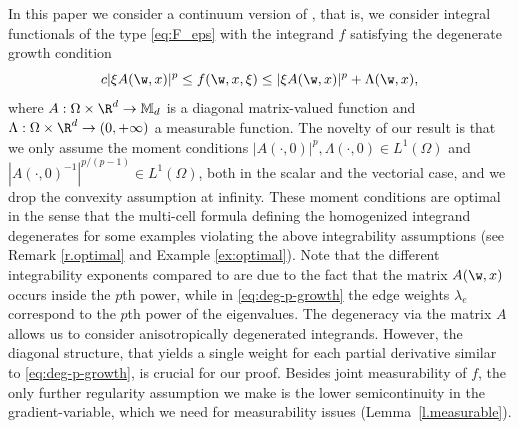 In this paper we consider a continuum version of \cite{NSS}, that is, we consider integral functionals of the type \eqref{eq:F_eps} with the integrand $f$ satisfying the degenerate growth condition\vspace*{-3pt}\enlargethispage{.5\baselineskip}%
\begin{equation}\label{eq:deg-growth}
c|\xi A(\w,x)|^p\leq f(\w,x,\xi)\leq |\xi A(\w,x)|^p+\Lambda(\w,x),
\end{equation}
where $A:\Omega\times\R^d\to \mathbb{M}_{d}$ is a diagonal matrix-valued function and $\Lambda:\Omega\times\R^d\to (0,+\infty)$ a measurable function. The novelty of our result is that we only assume the moment conditions $|A(\cdot,0)|^p,\Lambda(\cdot,0) \in L^1(\Omega)$ and $|A(\cdot,0)^{-1}|^{p/(p-1)}\in L^{1}(\Omega)$, both in the scalar and the vectorial case, and we drop the convexity assumption at infinity. These moment conditions are optimal in the sense that the multi-cell formula defining the homogenized integrand degenerates for some examples violating the above integrability assumptions (see Remark \ref{r.optimal} and Example \ref{ex:optimal}). Note that the different integrability exponents compared to \cite{NSS} are due to the fact that the matrix $A(\w,x)$ occurs inside the $p$th power, while in \eqref{eq:deg-p-growth} the edge weights $\lambda_e$ correspond to the $p$th power of the eigenvalues. The degeneracy via the matrix $A$ allows us to consider anisotropically degen\-er\-ated integrands. However, the diagonal structure, that yields a single weight for each partial derivative similar to \eqref{eq:deg-p-growth}, is crucial for our proof. Besides joint measurability of $f$, the only further regularity assumption we make is the lower semicontinuity in the gradient-variable, which we need for measurability issues (\cf Lemma~\ref{l.measurable}).

